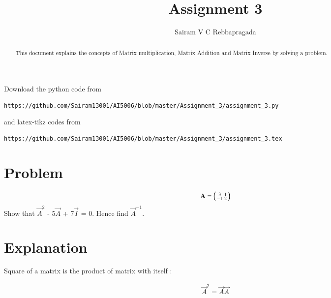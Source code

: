 \documentclass[journal,12pt,twocolumn]{IEEEtran}
\begin{document}
\renewcommand{\thefigure}{\theproblem}
\def\putbox#1#2#3{\makebox[0in][l]{\makebox[#1][l]{}\raisebox{\baselineskip}[0in][0in]{\raisebox{#2}[0in][0in]{#3}}}}
     \def\rightbox#1{\makebox[0in][r]{#1}}
     \def\centbox#1{\makebox[0in]{#1}}
     \def\topbox#1{\raisebox{-\baselineskip}[0in][0in]{#1}}
     \def\midbox#1{\raisebox{-0.5\baselineskip}[0in][0in]{#1}}
\vspace{3cm}
\title{Assignment 3}
\author{Sairam V C Rebbapragada}
\maketitle
\newpage
\bigskip
\renewcommand{\thefigure}{\theenumi}
\renewcommand{\thetable}{\theenumi}
\begin{abstract}
This document explains the concepts of Matrix multiplication, Matrix Addition and Matrix Inverse by solving a problem.
\end{abstract}
Download the python code from 
%
\begin{lstlisting}
https://github.com/Sairam13001/AI5006/blob/master/Assignment_3/assignment_3.py
\end{lstlisting}
%
and latex-tikz codes from 
%
\begin{lstlisting}
https://github.com/Sairam13001/AI5006/blob/master/Assignment_3/assignment_3.tex
\end{lstlisting}
%
\section{Problem}
\begin{align}
   \mathbf{A}  = \begin{psmallmatrix} 3 & 1\\ -1 & 2\end{psmallmatrix}     
\end{align}
Show that $\vec{A}^2$ - 5$\vec{A}$ + 7$\vec{I}$ = 0. Hence find $\vec{A}^{-1}$.


\section{Explanation}

Square of a matrix is the product of matrix with itself :

\begin{align}
\vec{A}^2 = \vec{A}\vec{A}
\end{align}
\end{document}

